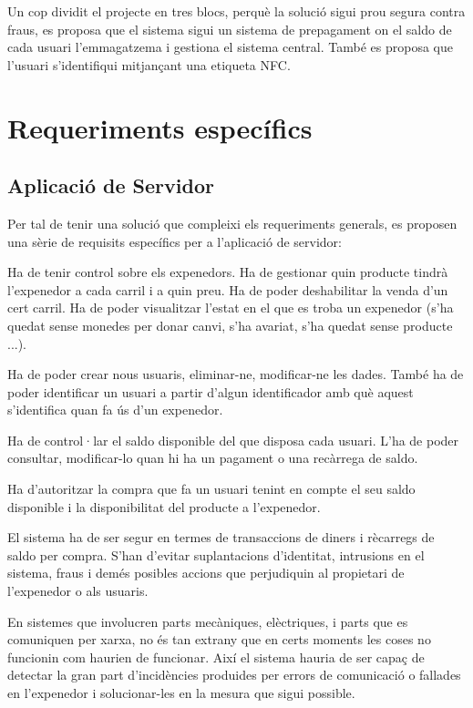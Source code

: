 Un cop dividit el projecte en tres blocs, perquè la solució sigui prou segura contra fraus, es proposa que el sistema sigui un sistema de prepagament on el saldo de cada usuari l'emmagatzema i gestiona el sistema central. També es proposa que l'usuari s'identifiqui mitjançant una etiqueta NFC.

\section{Requeriments específics}
\subsection{Aplicació de Servidor}
Per tal de tenir una solució que compleixi els requeriments generals, es proposen una sèrie de requisits específics per a l'aplicació de servidor:
\begin{description}[font=\normalfont\textbf]\itemsep2pt 
\vspace{-1em}
\parskip1pt 
\item[Gestió d'expenedors] Ha de tenir control sobre els expenedors. Ha de gestionar quin producte tindrà l'expenedor a cada carril i a quin preu. Ha de poder deshabilitar la venda d'un cert carril. Ha de poder visualitzar l'estat en el que es troba un expenedor (s'ha quedat sense monedes per donar canvi, s'ha avariat, s'ha quedat sense producte ...).
\item[Gestió d'usuaris] Ha de poder crear nous usuaris, eliminar-ne, modificar-ne les dades. També ha de poder identificar un usuari a partir d'algun identificador amb què aquest s'identifica quan fa ús d'un expenedor.
\item[Gestió del saldo disponible] Ha de control·lar el saldo disponible del que disposa cada usuari. L'ha de poder consultar, modificar-lo quan hi ha un pagament o una recàrrega de saldo. 
\item[Gestió de les compres] Ha d'autoritzar la compra que fa un usuari tenint en compte el seu saldo disponible i la disponibilitat del producte a l'expenedor.
\item[Seguretat en les transaccions] El sistema ha de ser segur en termes de transaccions de diners i rècarregs de saldo per compra. S'han d'evitar suplantacions d'identitat, intrusions en el sistema, fraus i demés posibles accions que perjudiquin al propietari de l'expenedor o als usuaris.
\item[Detecció i gestió d'incidencies] En sistemes que involucren parts mecàniques, elèctriques, i parts que es comuniquen per xarxa, no és tan extrany que en certs moments les coses no funcionin com haurien de funcionar. Així el sistema hauria de ser capaç de detectar la gran part d'incidències produides per errors de comunicació o fallades en l'expenedor i solucionar-les en la mesura que sigui possible.
\vspace{-1em}
\end{description}

